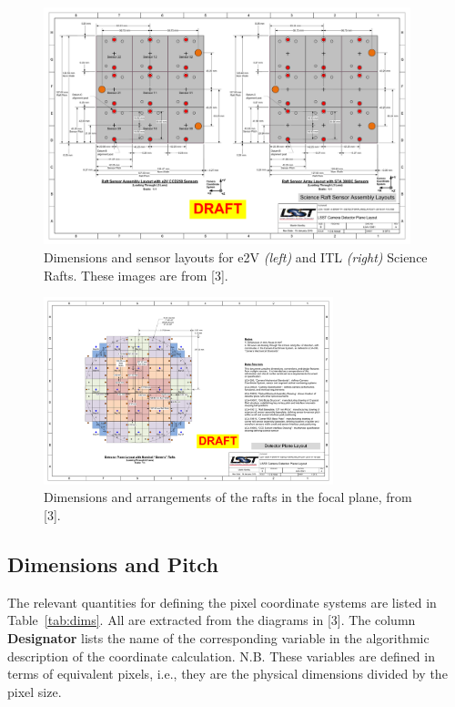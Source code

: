 \documentclass{article}[12pt]
\begin{document}
\begin{figure}
\centering
    \includegraphics[width=0.95\textwidth]{raft_layout.pdf}
    \caption{Dimensions and sensor layouts for e2V {\it (left)} and ITL {\it (right)} Science Rafts.  These images are from [3].}
    \label{fig:raft}
\end{figure}

\begin{figure}
\centering
    \includegraphics[width=0.75\textwidth]{focal_plane_layout.pdf}
    \caption{Dimensions and arrangements of the rafts in the focal plane, from [3].}
    \label{fig:focalplane}
\end{figure}

\subsection{Dimensions and Pitch}
The relevant quantities for defining the pixel coordinate systems are listed in Table~\ref{tab:dims}.  All are extracted from the diagrams in [3].  The column {\bf Designator} lists the name of the corresponding variable in the algorithmic description of the coordinate calculation.  N.B. These variables are defined in terms of equivalent pixels, i.e., they are the physical dimensions divided by the pixel size.
\end{document}
